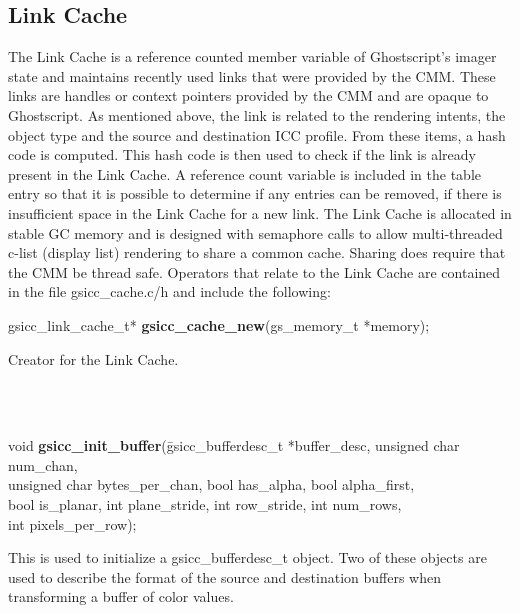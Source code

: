 \documentclass[12pt,notitlepage]{article}
\begin{document}
\singlespace

\subsection{Link Cache}

The Link Cache is a reference counted member variable of Ghostscript's imager state and maintains recently used links that were provided by the CMM.  These links are handles or context pointers provided by the CMM and are opaque to Ghostscript.  As mentioned above, the link is related to the rendering intents, the object type and the source and destination ICC profile.  From these items, a hash code is computed.  This hash code is then used to check if the link is already present in the Link Cache.  A reference count variable is included in the table entry so that it is possible to determine if any entries can be removed, if there is insufficient space in the Link Cache for a new link.
The Link Cache is allocated in stable GC memory and is designed with semaphore calls to allow multi-threaded c-list (display list) rendering to share a common cache.   Sharing does require that the CMM be thread safe.
Operators that relate to the Link Cache are contained in the file gsicc\_cache.c/h and include the following:\\

\singlespace

\begin{tabbing}
\noindent gsicc\_link\_cache\_t* {\bf gsicc\_cache\_new}(gs\_memory\_t *memory);\\
\end{tabbing}

\begin{minipage}[h]{6.0in}
Creator for the Link Cache.
\end{minipage}\\
\\

\begin{tabbing}
\noindent void {\bf gsicc\_init\_buffer}(\=gsicc\_bufferdesc\_t *buffer\_desc, unsigned char num\_chan,\\
\>unsigned char bytes\_per\_chan, bool has\_alpha, bool alpha\_first,\\
\>bool is\_planar, int plane\_stride, int row\_stride, int num\_rows, \\
\> int pixels\_per\_row);\\
\end{tabbing}

\begin{minipage}[h]{6.0in}
This is used to initialize a gsicc\_bufferdesc\_t object. Two of these objects are used to describe the format of the source and destination buffers when transforming a buffer of color values.
\end{minipage}\\
\\
\end{document}
